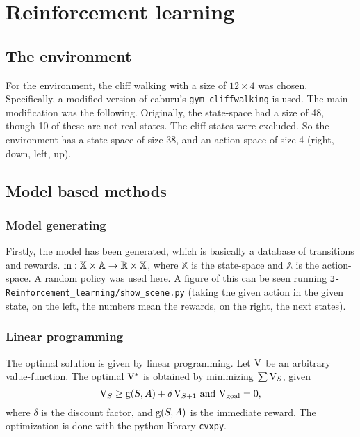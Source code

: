 \section{Reinforcement learning}

\subsection{The environment}

For the environment, the cliff walking with a size of $12\times4$ was chosen.
Specifically, a modified version of caburu's \verb|gym-cliffwalking|\cite{cliffwalking} is used.
The main modification was the following.
Originally, the state-space had a size of 48, though 10 of these are not real states.
The cliff states were excluded.
So the environment has a state-space of size 38,
and an action-space of size 4 (right, down, left, up).


\subsection{Model based methods}

\subsubsection{Model generating}

Firstly, the model has been generated, which is basically a database of transitions and
rewards. $\mathrm{m}: \mathbb{X}\times\mathbb{A}\rightarrow\mathbb{R}\times\mathbb{X}$,
where $\mathbb{X}$ is the state-space and $\mathbb{A}$ is the action-space. A random
policy was used here. A figure of this can be seen running
\verb|3-Reinforcement_learning/show_scene.py| (taking the given action in the given state,
on the left, the numbers mean the rewards, on the right, the next states).

\subsubsection{Linear programming}

The optimal solution is given by linear programming.
Let $\mathrm{V}$ be an arbitrary value-function.
The optimal $\mathrm{V}^*$ is obtained by minimizing $\sum\mathrm{V}_S$, given
\begin{equation}
	\mathrm{V}_S\geq\mathrm{g}
(S, A) + \delta\,\mathrm{V}_{S+1} \text{ and } \mathrm{V}_\text{goal}=0,
\end{equation}
where $\delta$ is the discount factor, and $\mathrm{g}(S, A)$ is the immediate reward.
The optimization is done with the python library \verb|cvxpy|.

